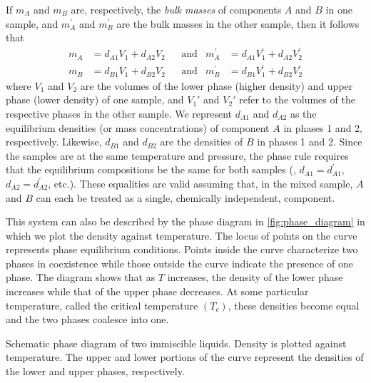 If \(m_A\) and \(m_B\) are, respectively, the \emph{bulk masses} of components \(A\) and \(B\) in one sample, and \(m_A^\prime\) and \(m_B^\prime\) are the bulk masses in the other sample, then it follows that
\begin{align}
	m_A &= d_{A1} V_1 + d_{A2} V_2 && \text{and} & m_A^\prime &= d_{A1} V_1^\prime + d_{A2} V_2^\prime
	\label{eq:two_samples_a}\\
	m_B &= d_{B1} V_1 + d_{B2} V_2 && \text{and} & m_B^\prime &= d_{B1} V_1^\prime + d_{B2} V_2^\prime
	\label{eq:two_samples_b}
\end{align}
where \(V_1\) and \(V_2\) are the volumes of the lower phase (higher density) and upper phase (lower density) of one sample, and \(V_1'\) and \(V_2'\) refer to the volumes of the respective phases in the other sample. 
We represent \(d_{A1}\) and \(d_{A2}\) as the equilibrium densities (or mass concentrations) of component \(A\) in phases 1 and 2, respectively. Likewise, \(d_{B1}\) and \(d_{B2}\) are the densities of \(B\) in phases 1 and 2. 
Since the samples are at the same temperature and pressure, the phase rule requires that the equilibrium compositions be the same for both samples (\ie, \(d_{A1} = d_{A1}^\prime\), \(d_{A2} = d_{A2}^\prime\), etc.). 
These equalities are valid assuming that, in the mixed sample, \(A\) and \(B\) can each be treated as a single, chemically independent, component. 

This system can also be described by the phase diagram in \cref{fig:phase_diagram} in which we plot the density against temperature. 
The locus of points on the curve represents phase equilibrium conditions. 
Points inside the curve characterize two phases in coexistence while  those outside the curve indicate the presence of one phase. 
The diagram shows that as \(T\) increases, the density of the lower phase increases while that of the upper phase decreases. 
At some particular temperature, called the critical temperature \((T_c)\), these densities become equal and the two phases coalesce into one.
\begin{marginfigure}
	
	\caption{Schematic phase diagram of two immiscible liquids. 
	Density is plotted against temperature. 
	The upper and lower portions of the curve represent the densities of the lower and upper phases, respectively.}
	\label{fig:phase_diagram}
\end{marginfigure}

